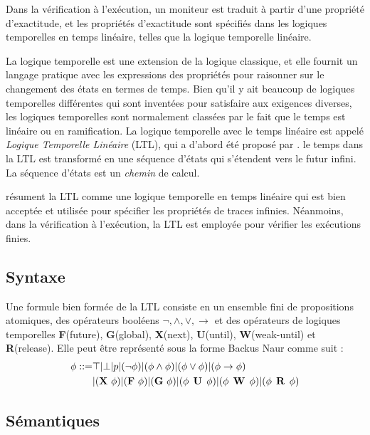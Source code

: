 Dans la vérification à l'exécution, un moniteur est traduit à partir d'une propriété d'exactitude, et les propriétés d'exactitude sont spécifiés dans les logiques temporelles en temps linéaire, telles que la logique temporelle linéaire.

La logique temporelle est une extension de la logique classique, et elle fournit un langage pratique avec les expressions des propriétés pour raisonner sur le changement des états en termes de temps. Bien qu'il y ait beaucoup de logiques temporelles différentes qui sont inventées pour satisfaire aux exigences diverses, les logiques temporelles sont normalement classées par le fait que le temps est linéaire ou en ramification. La logique temporelle avec le temps linéaire est appelé \emph{Logique Temporelle Linéaire} (LTL), qui a d'abord été proposé par \cite{pnueli97}. le temps dans la LTL est transformé en une séquence d'états qui s'étendent vers le futur infini. La séquence d'états est un \emph{chemin} de calcul. \citep{clarke1999model,huth2004}

\cite{leucker2009brief} résument la LTL comme une logique temporelle en temps linéaire qui est bien acceptée et utilisée pour spécifier les propriétés de traces infinies. Néanmoins, dans la vérification à l'exécution, la LTL est employée pour vérifier les exécutions finies.

\subsection{Syntaxe}

Une formule bien formée de la LTL consiste en un ensemble fini de propositions atomiques, des opérateurs booléens $\neg, \wedge, \vee, \rightarrow$ et des opérateurs de logiques temporelles \textbf{F}(future), \textbf{G}(global), \textbf{X}(next), \textbf{U}(until), \textbf{W}(weak-until) et \textbf{R}(release). Elle peut être représenté sous la forme Backus Naur comme suit \citep{huth2004}:
\begin{align}
\phi ::= & \top | \bot | p | (\neg\phi) | (\phi \wedge \phi) | (\phi \vee \phi) | (\phi \rightarrow \phi) \nonumber \\
& | (\mathop{\mbox{\textbf{X}}}\, \phi) | (\mathop{\mbox{\textbf{F}}}\, \phi) | (\mathop{\mbox{\textbf{G}}}\, \phi) | (\phi \mathrel{\mbox{\,\textbf{U}}}\, \phi) | (\phi \mathrel{\mbox{\,\textbf{W}}}\, \phi) | (\phi \mathrel{\mbox{\,\textbf{R}}}\, \phi)
\end{align}

\subsection{Sémantiques}

